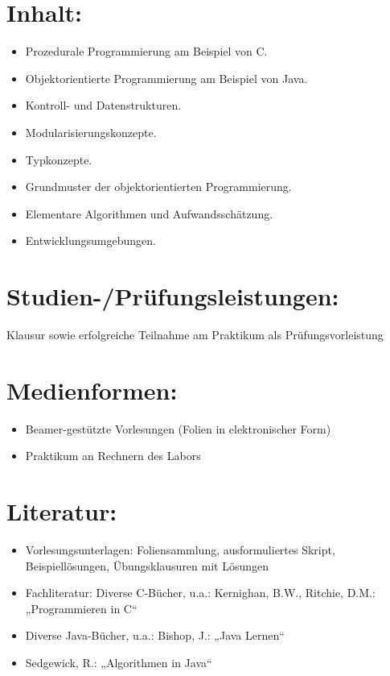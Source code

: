\section*{Inhalt:}\label{inhalt}

\begin{itemize}
\tightlist
\item
  Prozedurale Programmierung am Beispiel von C.
\item
  Objektorientierte Programmierung am Beispiel von Java.
\item
  Kontroll- und Datenstrukturen.
\item
  Modularisierungskonzepte.
\item
  Typkonzepte.
\item
  Grundmuster der objektorientierten Programmierung.
\item
  Elementare Algorithmen und Aufwandsschätzung.
\item
  Entwicklungsumgebungen.
\end{itemize}

\section*{Studien-/Prüfungsleistungen:}\label{studien-pruxfcfungsleistungen}

Klausur sowie erfolgreiche Teilnahme am Praktikum als
Prüfungsvorleistung

\section*{Medienformen:}\label{medienformen}

\begin{itemize}
\tightlist
\item
  Beamer-gestützte Vorlesungen (Folien in elektronischer Form)
\item
  Praktikum an Rechnern des Labors
\end{itemize}

\section*{Literatur:}\label{literatur}

\begin{itemize}
\tightlist
\item
  Vorlesungsunterlagen: Foliensammlung, ausformuliertes Skript,
  Beispiellösungen, Übungsklausuren mit Lösungen
\item
  Fachliteratur: Diverse C-Bücher, u.a.: Kernighan, B.W., Ritchie, D.M.:
  „Programmieren in C``
\item
  Diverse Java-Bücher, u.a.: Bishop, J.: „Java Lernen``
\item
  Sedgewick, R.: „Algorithmen in Java``
\end{itemize}

